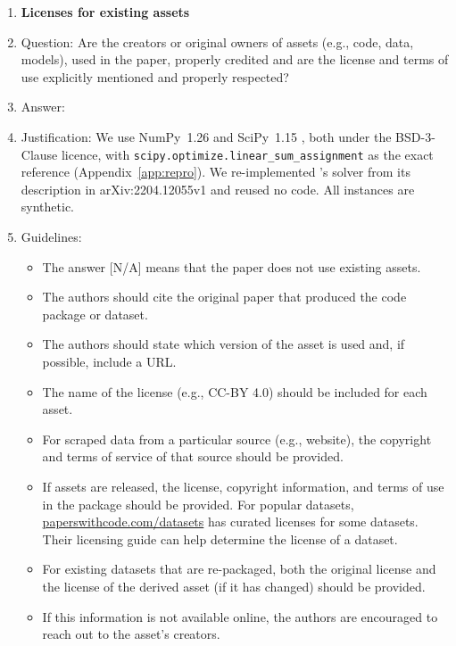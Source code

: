 \begin{enumerate}
\item {\bf Licenses for existing assets}
    \item[] Question: Are the creators or original owners of assets (e.g., code, data, models), used in the paper, properly credited and are the license and terms of use explicitly mentioned and properly respected?
    \item[] Answer: \answerYes{}
    \item[] Justification: We use NumPy~1.26 \citep{harris2020} and SciPy~1.15 \citep{virtanen2020}, both under the BSD-3-Clause licence, with \texttt{scipy.optimize.linear\_sum\_assignment} as the exact reference (Appendix~\ref{app:repro}). We re-implemented \citeauthor{chen2022}'s solver from its description in arXiv:2204.12055v1 and reused no code. All instances are synthetic.
    \item[] Guidelines:
    \begin{itemize}
        \item The answer [N/A] means that the paper does not use existing assets.
        \item The authors should cite the original paper that produced the code package or dataset.
        \item The authors should state which version of the asset is used and, if possible, include a URL.
        \item The name of the license (e.g., CC-BY 4.0) should be included for each asset.
        \item For scraped data from a particular source (e.g., website), the copyright and terms of service of that source should be provided.
        \item If assets are released, the license, copyright information, and terms of use in the package should be provided. For popular datasets, \url{paperswithcode.com/datasets} has curated licenses for some datasets. Their licensing guide can help determine the license of a dataset.
        \item For existing datasets that are re-packaged, both the original license and the license of the derived asset (if it has changed) should be provided.
        \item If this information is not available online, the authors are encouraged to reach out to the asset's creators.
    \end{itemize}


\end{enumerate}
